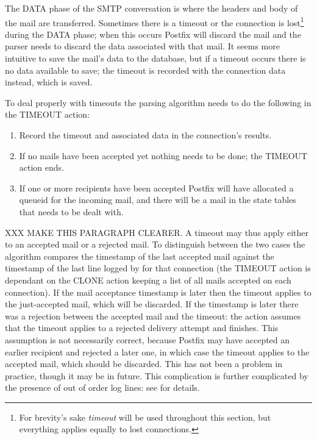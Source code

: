 The DATA phase of the \gls{SMTP} conversation is where the headers and body
of the mail are transferred.  Sometimes there is a timeout or the
connection is lost\footnote{For brevity's sake \textit{timeout\/} will be
used throughout this section, but everything applies equally to lost
connections.} during the DATA phase; when this occurs Postfix will discard
the mail and the parser needs to discard the data associated with that
mail.  It seems more intuitive to save the mail's data to the database, but
if a timeout occurs there is no data available to save; the timeout is
recorded with the connection data instead, which is saved.

To deal properly with timeouts the parsing algorithm needs to do the
following in the TIMEOUT action:

\begin{enumerate}

    \item Record the timeout and associated data in the connection's
        results.

    \item If no mails have been accepted yet nothing needs to be done; the
        TIMEOUT action ends.  

    \item If one or more recipients have been accepted Postfix will have
        allocated a queueid for the incoming mail, and there will be a mail
        in the state tables that needs to be dealt with.

\end{enumerate}

XXX MAKE THIS PARAGRAPH CLEARER\@.  A timeout may thus apply either to an
accepted mail or a rejected mail.  To distinguish between the two cases the
algorithm compares the timestamp of the last accepted mail against the
timestamp of the last line logged by  for that connection
(the TIMEOUT action is dependant on the CLONE action keeping a list of all
mails accepted on each connection).  If the mail acceptance timestamp is
later then the timeout applies to the just-accepted mail, which will be
discarded.  If the  timestamp is later there was a rejection
between the accepted mail and the timeout: the action assumes that the
timeout applies to a rejected delivery attempt and finishes.  This
assumption is not necessarily correct, because Postfix may have accepted an
earlier recipient and rejected a later one, in which case the timeout
applies to the accepted mail, which should be discarded.  This has not been
a problem in practice, though it may be in future.  This complication is
further complicated by the presence of out of order  log
lines: see  for details.

